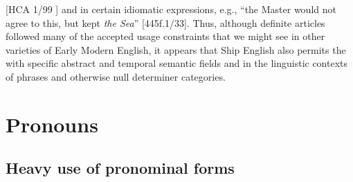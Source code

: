 [HCA 1/99  \citealt{Islands1722}] and in certain idiomatic expressions, e.g., “the Master would not agree to this, but kept \textit{the Sea}” [445f.1/33]. Thus, although definite articles followed many of the accepted usage constraints that we might see in other varieties of Early Modern English, it appears that Ship English also permits the  with specific abstract and temporal semantic fields and in the linguistic contexts of  phrases and otherwise null determiner categories. 

\section{{Pronouns}}\label{sec:5.4}

\subsection{{Heavy use of pronominal forms}}\label{sec:5.4.1}

